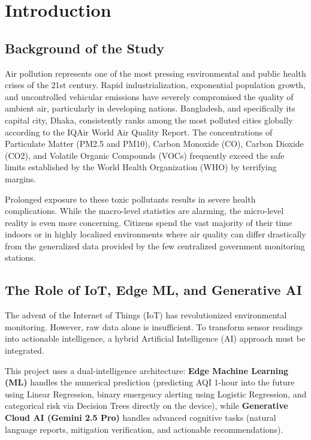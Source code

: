 \documentclass[12pt,a4paper]{report}
\begin{document}
\chapter{Introduction}
\section{Background of the Study}
Air pollution represents one of the most pressing environmental and public health crises of the 21st century. Rapid industrialization, exponential population growth, and uncontrolled vehicular emissions have severely compromised the quality of ambient air, particularly in developing nations. Bangladesh, and specifically its capital city, Dhaka, consistently ranks among the most polluted cities globally according to the IQAir World Air Quality Report. The concentrations of Particulate Matter (PM2.5 and PM10), Carbon Monoxide (CO), Carbon Dioxide (CO2), and Volatile Organic Compounds (VOCs) frequently exceed the safe limits established by the World Health Organization (WHO) by terrifying margins.

Prolonged exposure to these toxic pollutants results in severe health complications. While the macro-level statistics are alarming, the micro-level reality is even more concerning. Citizens spend the vast majority of their time indoors or in highly localized environments where air quality can differ drastically from the generalized data provided by the few centralized government monitoring stations.

\section{The Role of IoT, Edge ML, and Generative AI}
The advent of the Internet of Things (IoT) has revolutionized environmental monitoring. However, raw data alone is insufficient. To transform sensor readings into actionable intelligence, a hybrid Artificial Intelligence (AI) approach must be integrated. 

This project uses a dual-intelligence architecture: \textbf{Edge Machine Learning (ML)} handles the numerical prediction (predicting AQI 1-hour into the future using Linear Regression, binary emergency alerting using Logistic Regression, and categorical risk via Decision Trees directly on the device), while \textbf{Generative Cloud AI (Gemini 2.5 Pro)} handles advanced cognitive tasks (natural language reports, mitigation verification, and actionable recommendations).
\end{document}
